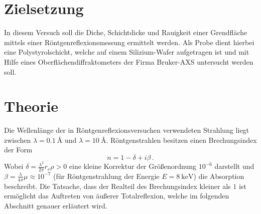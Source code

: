 \section{Zielsetzung}
In diesem Versuch soll die Diche, Schichtdicke und Rauigkeit einer Grendfläche mittels einer Röntgenreflexionsmessung ermittelt werden.
Als Probe dient hierbei eine Polystyrolschicht, welche auf einem Silizium-Wafer aufgetragen ist und mit Hilfe eines Oberflächendiffraktometers der Firma Bruker-AXS untersucht werden soll.

\section{Theorie}
Die Wellenlänge der in Röntgenreflexionsversuchen verwendeten Strahlung liegt zwischen $\lambda = \SI{0,1}{\angstrom}$ und $\lambda = \SI{10}{\angstrom}$.
Röntgenstrahlen besitzen einen Brechungsindex der Form
\begin{equation}
    n=1-\delta + i \beta \, .
\end{equation}
Wobei $\delta = \frac{\lambda^2}{2\pi}r_e\rho > 0$ eine kleine Korrektur der Größenordnung $10^{-6}$ darstellt und $\beta = \frac{\lambda}{4\pi}\mu \approx 10^{-7}$ (für Röntgenstrahlung der Energie $E=\SI{8}{\keV}$) die Absorption beschreibt.
Die Tatsache, dass der Realteil des Brechungsindex kleiner als $1$ ist ermöglicht das Auftreten von äußerer Totalreflexion, welche im folgenden Abschnitt genauer erläutert wird.

